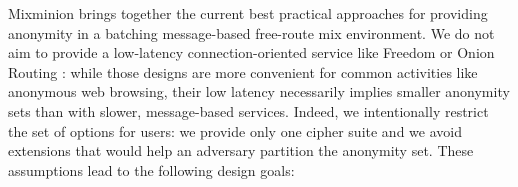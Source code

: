 \documentclass[times,10pt,twocolumn]{article}
\begin{document}





\label{sec:assumptions}

Mixminion brings together the current best practical approaches
for providing anonymity in a batching message-based free-route mix
environment. We do not aim to provide a low-latency connection-oriented
service like Freedom \cite{freedom} or Onion Routing \cite{syverson_2000}:
while those designs are more convenient for common activities like
anonymous web browsing, their low latency necessarily implies smaller
anonymity sets than with slower, message-based services. Indeed, we
intentionally restrict the set of options for users: we provide only one
cipher suite and we avoid extensions that would help an adversary partition
the anonymity set. These assumptions lead to the following design goals:

\end{document}
